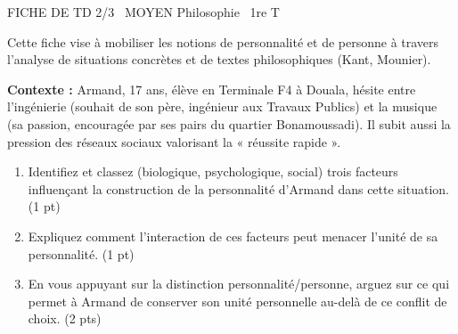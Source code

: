 \documentclass[11pt]{article}
\begin{document}
\begin{tcolorbox}[enhanced,colback=popink,colframe=popink,arc=10pt,boxrule=0pt,left=12pt,right=12pt,top=9pt,bottom=9pt]
{\color{white}\popxbold\small FICHE DE TD 2/3 \textbullet\ MOYEN \hfill Philosophie \textbullet\ 1re T\par}
\end{tcolorbox}
\vspace{4pt}
Cette fiche vise à mobiliser les notions de personnalité et de personne à travers l'analyse de situations concrètes et de textes philosophiques (Kant, Mounier).

\begin{exercice}
\textbf{Contexte :} Armand, 17 ans, élève en Terminale F4 à Douala, hésite entre l'ingénierie (souhait de son père, ingénieur aux Travaux Publics) et la musique (sa passion, encouragée par ses pairs du quartier Bonamoussadi). Il subit aussi la pression des réseaux sociaux valorisant la « réussite rapide ».
\begin{enumerate}
    \item Identifiez et classez (biologique, psychologique, social) trois facteurs influençant la construction de la personnalité d'Armand dans cette situation. (1 pt)
    \item Expliquez comment l'interaction de ces facteurs peut menacer l'unité de sa personnalité. (1 pt)
    \item En vous appuyant sur la distinction personnalité/personne, arguez sur ce qui permet à Armand de conserver son unité personnelle au-delà de ce conflit de choix. (2 pts)
\end{enumerate}
\end{exercice}
\end{document}

